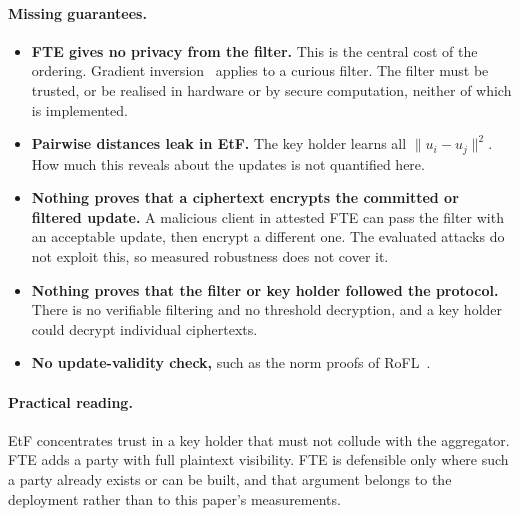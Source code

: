 \paragraph{Missing guarantees.}
\begin{itemize}
\item \textbf{FTE gives no privacy from the filter.} This is the central cost of the ordering. Gradient inversion~\cite{zhu2019dlg,geiping2020inverting} applies to a curious filter. The filter must be trusted, or be realised in hardware or by secure computation, neither of which is implemented.
\item \textbf{Pairwise distances leak in EtF.} The key holder learns all $\|u_i-u_j\|^2$. How much this reveals about the updates is not quantified here.
\item \textbf{Nothing proves that a ciphertext encrypts the committed or filtered update.} A malicious client in attested FTE can pass the filter with an acceptable update, then encrypt a different one. The evaluated attacks do not exploit this, so measured robustness does not cover it.
\item \textbf{Nothing proves that the filter or key holder followed the protocol.} There is no verifiable filtering and no threshold decryption, and a key holder could decrypt individual ciphertexts.
\item \textbf{No update-validity check,} such as the norm proofs of RoFL~\cite{lycklama2023rofl}.
\end{itemize}

\paragraph{Practical reading.}
EtF concentrates trust in a key holder that must not collude with the aggregator. FTE adds a party with full plaintext visibility. FTE is defensible only where such a party already exists or can be built, and that argument belongs to the deployment rather than to this paper's measurements.
